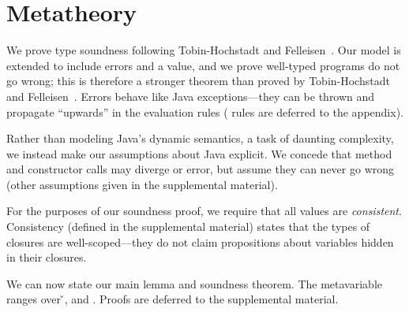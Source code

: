 \section{Metatheory}
\label{sec:metatheory}

We prove type soundness following Tobin-Hochstadt and Felleisen~\cite{TF10}.  Our model is extended
to include errors \errorvalv{} and a \wrong{} value, and we prove well-typed
programs do not go wrong; this is therefore a stronger theorem than
proved by Tobin-Hochstadt and Felleisen~\cite{TF10}. 
Errors behave like Java exceptions---they can be thrown and propagate ``upwards'' in the evaluation rules
(\errorvalv{} rules are deferred to the appendix).

Rather than modeling Java's dynamic semantics, a task of daunting
complexity, we instead make our assumptions about Java explicit. We
concede that method and constructor calls may diverge or error, but
assume they can never go wrong
(other assumptions given in the supplemental material).

{}



For the purposes of our soundness proof, we require that all values
are \emph{consistent}.  Consistency (defined in the supplemental
material) states that the types of closures are well-scoped---they do
not claim propositions about variables hidden in their closures.


We can now state our main lemma and soundness theorem.  The
metavariable  ranges over \v{}, \errorvalv{} and
\wrong{}. Proofs are deferred to the supplemental material. %

\begin{lemma}\label{main:lemma:soundness}

  {\soundnesslemmahypothesis}
\end{lemma}



{}

%
